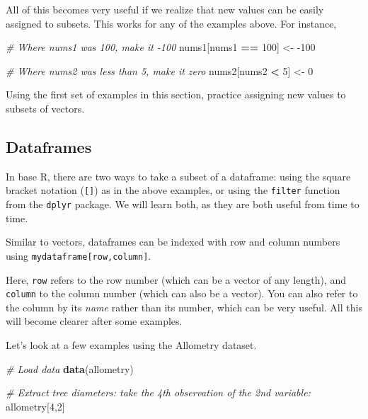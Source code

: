 \documentclass[]{book}
\newenvironment{Shaded}{\begin{snugshade}}{\end{snugshade}}
\newcommand{\CommentTok}[1]{\textcolor[rgb]{0.56,0.35,0.01}{\textit{#1}}}
\newcommand{\DecValTok}[1]{\textcolor[rgb]{0.00,0.00,0.81}{#1}}
\newcommand{\KeywordTok}[1]{\textcolor[rgb]{0.13,0.29,0.53}{\textbf{#1}}}
\newcommand{\NormalTok}[1]{#1}
\newcommand{\OperatorTok}[1]{\textcolor[rgb]{0.81,0.36,0.00}{\textbf{#1}}}
\newcommand{\StringTok}[1]{\textcolor[rgb]{0.31,0.60,0.02}{#1}}
\let\BeginKnitrBlock\begin \let\EndKnitrBlock\end
\begin{document}
All of this becomes very useful if we realize that new values can be easily assigned to subsets. This works for any of the examples above. For instance,

\begin{Shaded}
\begin{Highlighting}[]
\CommentTok{# Where nums1 was 100, make it -100}
\NormalTok{nums1[nums1 }\OperatorTok{==}\StringTok{ }\DecValTok{100}\NormalTok{] <-}\StringTok{ }\DecValTok{-100}

\CommentTok{# Where nums2 was less than 5, make it zero}
\NormalTok{nums2[nums2 }\OperatorTok{<}\StringTok{ }\DecValTok{5}\NormalTok{] <-}\StringTok{ }\DecValTok{0}
\end{Highlighting}
\end{Shaded}

\BeginKnitrBlock{rmdtry}
Using the first set of examples in this section, practice assigning new values to subsets of vectors.
\EndKnitrBlock{rmdtry}

\hypertarget{subsetdataframes}{%
\subsection{Dataframes}\label{subsetdataframes}}

In base R, there are two ways to take a subset of a dataframe: using the square bracket notation (\texttt{{[}{]}}) as in the above examples, or using the \texttt{filter} function from the \texttt{dplyr} package. We will learn both, as they are both useful from time to time.

Similar to vectors, dataframes can be indexed with row and column numbers using \texttt{mydataframe{[}row,column{]}}.

Here, \texttt{row} refers to the row number (which can be a vector of any length), and \texttt{column} to the column number (which can also be a vector). You can also refer to the column by its \emph{name} rather than its number, which can be very useful. All this will become clearer after some examples.

Let's look at a few examples using the Allometry dataset.

\begin{Shaded}
\begin{Highlighting}[]
\CommentTok{# Load data}
\KeywordTok{data}\NormalTok{(allometry)}

\CommentTok{# Extract tree diameters: take the 4th observation of the 2nd variable:}
\NormalTok{allometry[}\DecValTok{4}\NormalTok{,}\DecValTok{2}\NormalTok{]}
\end{Highlighting}
\end{Shaded}
\end{document}
